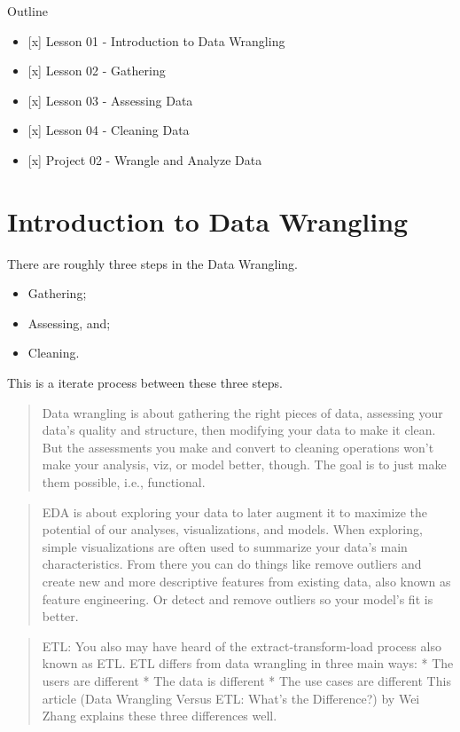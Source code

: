 \documentclass[]{book}
\providecommand{\tightlist}{%
  \setlength{\itemsep}{0pt}\setlength{\parskip}{0pt}}
\begin{document}
Outline

\begin{itemize}
\tightlist
\item
  {[}x{]} Lesson 01 - Introduction to Data Wrangling
\item
  {[}x{]} Lesson 02 - Gathering
\item
  {[}x{]} Lesson 03 - Assessing Data
\item
  {[}x{]} Lesson 04 - Cleaning Data
\item
  {[}x{]} Project 02 - Wrangle and Analyze Data
\end{itemize}

\section{Introduction to Data
Wrangling}\label{introduction-to-data-wrangling}

There are roughly three steps in the Data Wrangling.

\begin{itemize}
\tightlist
\item
  Gathering;
\item
  Assessing, and;
\item
  Cleaning.
\end{itemize}

This is a iterate process between these three steps.

\begin{quote}
Data wrangling is about gathering the right pieces of data, assessing
your data's quality and structure, then modifying your data to make it
clean. But the assessments you make and convert to cleaning operations
won't make your analysis, viz, or model better, though. The goal is to
just make them possible, i.e., functional.
\end{quote}

\begin{quote}
EDA is about exploring your data to later augment it to maximize the
potential of our analyses, visualizations, and models. When exploring,
simple visualizations are often used to summarize your data's main
characteristics. From there you can do things like remove outliers and
create new and more descriptive features from existing data, also known
as feature engineering. Or detect and remove outliers so your model's
fit is better.
\end{quote}

\begin{quote}
ETL: You also may have heard of the extract-transform-load process also
known as ETL. ETL differs from data wrangling in three main ways: * The
users are different * The data is different * The use cases are
different This article (Data Wrangling Versus ETL: What's the
Difference?) by Wei Zhang explains these three differences well.
\end{quote}
\end{document}
